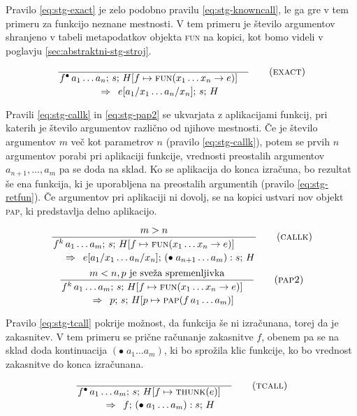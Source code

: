 Pravilo \ref{eq:stg-exact} je zelo podobno pravilu \ref{eq:stg-knowncall}, le ga gre v tem primeru za funkcijo neznane mestnosti. V tem primeru je število argumentov shranjeno v tabeli metapodatkov objekta \textsc{fun} na kopici, kot bomo videli v poglavju \ref{sec:abstraktni-stg-stroj}.

\begin{equation}
	\linfer[exact]{}{
		f^\bullet \, a_1 \dots a_n ; \, s; \, H[f \mapsto \textsc{fun}(x_1 \dots x_n \to e)]
	}{
		e[a_1 / x_1 \dots a_n / x_n]; \, s; \, H
	}
\label{eq:stg-exact}
\end{equation}

Pravili \ref{eq:stg-callk} in \ref{eq:stg-pap2} se ukvarjata z aplikacijami funkcij, pri katerih je število argumentov različno od njihove mestnosti. Če je število argumentov $m$ več kot parametrov $n$ (pravilo \ref{eq:stg-callk}), potem se prvih $n$ argumentov porabi pri aplikaciji funkcije, vrednosti preostalih argumentov $a_{n + 1}, \dots, a_m$ pa se doda na sklad. Ko se aplikacija do konca izračuna, bo rezultat še ena funkcija, ki je uporabljena na preostalih argumentih (pravilo \ref{eq:stg-retfun}). Če argumentov pri aplikaciji ni dovolj, se na kopici ustvari nov objekt \textsc{pap}, ki predstavlja delno aplikacijo.

\begin{equation}
	\linfer[callk]{
		m > n
	}{
		f^k \, a_1 \dots a_m ; \, s; \, H[f \mapsto \textsc{fun}(x_1 \dots x_n \to e)]
	}{
		e[a_1 / x_1 \dots a_n / x_n]; \, (\bullet \; a_{n + 1} \dots a_m) : s; \, H
	}
\label{eq:stg-callk}
\end{equation}
\vspace{1em}
\begin{equation}
	\linfer[pap2]{
		m < n, \text{$p$ je sveža spremenljivka}
	}{
		f^k \, a_1 \dots a_m ; \, s; \, H[f \mapsto \textsc{fun}(x_1 \dots x_n \to e)]
	}{
		p; \, s; \, H[p \mapsto \textsc{pap}(f \, a_1 \dots a_m)]
	}
\label{eq:stg-pap2}
\end{equation}

Pravilo \ref{eq:stg-tcall} pokrije možnost, da funkcija še ni izračunana, torej da je zakasnitev. V tem primeru se prične računanje zakasnitve $f$, obenem pa se na sklad doda kontinuacija $(\bullet \; a_1 \dots a_m)$, ki bo sprožila klic funkcije, ko bo vrednost zakasnitve do konca izračunana.

\begin{equation}
	\linfer[tcall]{}{
		f^\bullet \, a_1 \dots a_m ; \, s; \, H[f \mapsto \textsc{thunk}(e)]
	}{
		f; \, (\bullet \; a_1 \dots a_m) : s; \, H
	}
\label{eq:stg-tcall}
\end{equation}

